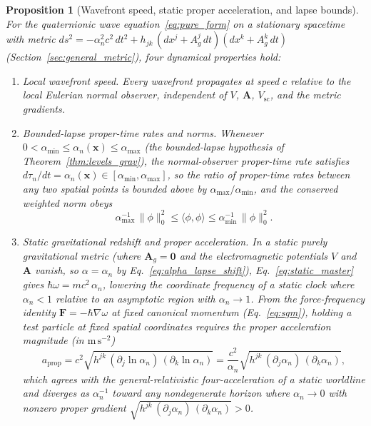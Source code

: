 \documentclass[aps,prd,onecolumn,tightenlines,nofootinbib,notitlepage,11pt,floatfix]{revtex4-2}
\theoremstyle{indentedtheorem}
\newtheorem{proposition}{Proposition}
\begin{document}
\begin{proposition}[Wavefront speed, static proper acceleration, and lapse bounds]
\label{prop:causal_lapse_gap}
For the quaternionic wave equation~\eqref{eq:pure_form} on a stationary spacetime with metric $ds^2 = -\alpha_n^2c^2\,dt^2 + h_{jk}\,(dx^j+A_g^j\,dt)(dx^k+A_g^k\,dt)$ (Section~\ref{sec:general_metric}), four dynamical properties hold:
\begin{enumerate}[label=(\roman*)]
\item \emph{Local wavefront speed.} Every wavefront propagates at speed $c$ relative to the local Eulerian normal observer, independent of $V$, $\mathbf{A}$, $V_\text{sc}$, and the metric gradients.
\item \emph{Bounded-lapse proper-time rates and norms.} Whenever $0 < \alpha_{\min} \le \alpha_n(\mathbf{x}) \le \alpha_{\max}$ (the bounded-lapse hypothesis of Theorem~\ref{thm:levels_grav}), the normal-observer proper-time rate satisfies $d\tau_n/dt = \alpha_n(\mathbf{x}) \in [\alpha_{\min},\alpha_{\max}]$, so the ratio of proper-time rates between any two spatial points is bounded above by $\alpha_{\max}/\alpha_{\min}$, and the conserved weighted norm obeys
\begin{equation}
    \alpha_{\max}^{-1}\,\|\phi\|_0^2 \le \langle\phi,\phi\rangle \le \alpha_{\min}^{-1}\,\|\phi\|_0^2 .
    \label{eq:weighted_norm_equiv}
\end{equation}
\item \emph{Static gravitational redshift and proper acceleration.} In a static purely gravitational metric (where $\mathbf{A}_g=\mathbf{0}$ and the electromagnetic potentials $V$ and $\mathbf{A}$ vanish, so $\alpha=\alpha_n$ by Eq.~\eqref{eq:alpha_lapse_shift}), Eq.~\eqref{eq:static_master} gives $\hbar\omega = mc^2\,\alpha_n$, lowering the coordinate frequency of a static clock where $\alpha_n < 1$ relative to an asymptotic region with $\alpha_n\to 1$. From the force-frequency identity $\mathbf{F}=-\hbar\nabla\omega$ at fixed canonical momentum (Eq.~\eqref{eq:sgm}), holding a test particle at fixed spatial coordinates requires the proper acceleration magnitude (in $\text{m}\,\text{s}^{-2}$)
\begin{equation}
    a_\text{prop} = c^2\sqrt{h^{jk}\,(\partial_j\ln\alpha_n)\,(\partial_k\ln\alpha_n)} = \frac{c^2}{\alpha_n}\sqrt{h^{jk}\,(\partial_j\alpha_n)\,(\partial_k\alpha_n)} ,
    \label{eq:proper_acceleration}
\end{equation}
which agrees with the general-relativistic four-acceleration of a static worldline and diverges as $\alpha_n^{-1}$ toward any nondegenerate horizon where $\alpha_n\to 0$ with nonzero proper gradient $\sqrt{h^{jk}\,(\partial_j\alpha_n)\,(\partial_k\alpha_n)}>0$.

\end{enumerate}
\end{proposition}
\end{document}
